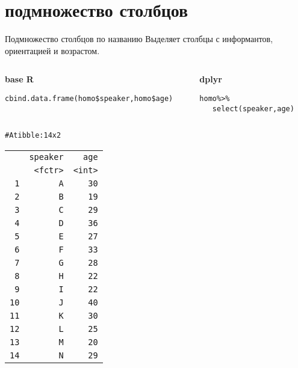 \section{подмножество столбцов}
\begin{frame}{Подмножество столбцов по названию}
\noindent Выделяет столбцы с информантов, ориентацией и возрастом.\\ \vfill
\begin{columns}[T] 
\begin{column}{.65\textwidth}
\textbf{base R}\\
\scriptsize
\begin{alltt}
cbind.data.frame(homo\$speaker, homo\$age)
\end{alltt}
\normalsize
\end{column}
\hfill
\begin{column}{.29\textwidth}
\textbf{dplyr}\\
\scriptsize
\begin{alltt}
homo \alert{\%>\%}\\ 
\ \ \ \alert{select(}speaker, age\alert{)}
\end{alltt}
\normalsize
\end{column}
\end{columns}
\hfill
\scriptsize
\begin{alltt}
\# A tibble: 14 x 2 \\
\begin{tabular}{rrr}
 & speaker & age \\ 
 & <fctr> & <int> \\ 
1 & A & 30 \\ 
2 & B & 19 \\ 
3 & C & 29 \\ 
4 & D & 36 \\ 
5 & E & 27 \\ 
6 & F & 33 \\ 
7 & G & 28 \\ 
8 & H & 22 \\ 
9 & I & 22 \\ 
10 & J & 40 \\ 
11 & K & 30 \\ 
12 & L & 25 \\ 
13 & M & 20 \\ 
14 & N & 29 \\ 
\end{tabular}
\\
\end{alltt}
\normalsize
\end{frame}

